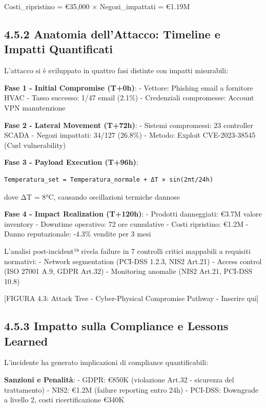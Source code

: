 \documentclass[12pt,a4paper,oneside]{book}
\numberwithin{figure}{chapter} %
\numberwithin{table}{chapter}  %
\begin{document}
Costi\_ripristino = €35,000 × Negozi\_impattati = €1.19M

\subsection{4.5.2 Anatomia dell'Attacco: Timeline e Impatti
Quantificati}\label{anatomia-dellattacco-timeline-e-impatti-quantificati}

L'attacco si è sviluppato in quattro fasi distinte con impatti
misurabili:

\textbf{Fase 1 - Initial Compromise (T+0h)}: - Vettore: Phishing email a
fornitore HVAC - Tasso successo: 1/47 email (2.1\%) - Credenziali
compromesse: Account VPN manutenzione

\textbf{Fase 2 - Lateral Movement (T+72h)}: - Sistemi compromessi: 23
controller SCADA - Negozi impattati: 34/127 (26.8\%) - Metodo: Exploit
CVE-2023-38545 (Curl vulnerability)

\textbf{Fase 3 - Payload Execution (T+96h)}:

\begin{verbatim}
Temperatura_set = Temperatura_normale + ΔT × sin(2πt/24h)
\end{verbatim}

dove ΔT = 8°C, causando oscillazioni termiche dannose

\textbf{Fase 4 - Impact Realization (T+120h)}: - Prodotti danneggiati:
€3.7M valore inventory - Downtime operativo: 72 ore cumulative - Costi
ripristino: €1.2M - Danno reputazionale: -4.3\% vendite per 3 mesi

L'analisi post-incident¹⁹ rivela failure in 7 controlli critici
mappabili a requisiti normativi: - Network segmentation (PCI-DSS 1.2.3,
NIS2 Art.21) - Access control (ISO 27001 A.9, GDPR Art.32) - Monitoring
anomalie (NIS2 Art.21, PCI-DSS 10.8)

{[}FIGURA 4.3: Attack Tree - Cyber-Physical Compromise Pathway -
Inserire qui{]}

\subsection{4.5.3 Impatto sulla Compliance e Lessons
Learned}\label{impatto-sulla-compliance-e-lessons-learned}

L'incidente ha generato implicazioni di compliance quantificabili:

\textbf{Sanzioni e Penalità}: - GDPR: €850K (violazione Art.32 -
sicurezza del trattamento) - NIS2: €1.2M (failure reporting entro 24h) -
PCI-DSS: Downgrade a livello 2, costi ricertificazione €340K
\end{document}
